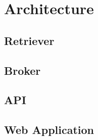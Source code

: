 \section{Architecture}
\subsection{Retriever}
\subsection{Broker}
\subsection{API}
\subsection{Web Application}